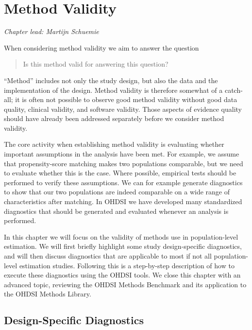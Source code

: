 \documentclass[11pt]{book}
\theoremstyle{definition}
\theoremstyle{definition}
\theoremstyle{definition}
\theoremstyle{remark}
\begin{document}
\chapter{Method Validity}\label{MethodValidity}


\emph{Chapter lead: Martijn Schuemie}

When considering method validity we aim to answer the question

\begin{quote}
Is this method valid for answering this question?
\end{quote}

``Method'' includes not only the study design, but also the data and the
implementation of the design. Method validity is therefore somewhat of a
catch-all; it is often not possible to observe good method validity
without good data quality, clinical validity, and software validity.
Those aspects of evidence quality should have already been addressed
separately before we consider method validity.

The core activity when establishing method validity is evaluating
whether important assumptions in the analysis have been met. For
example, we assume that propensity-score matching makes two populations
comparable, but we need to evaluate whether this is the case. Where
possible, empirical tests should be performed to verify these
assumptions. We can for example generate diagnostics to show that our
two populations are indeed comparable on a wide range of characteristics
after matching. In OHDSI we have developed many standardized diagnostics
that should be generated and evaluated whenever an analysis is
performed.

In this chapter we will focus on the validity of methods use in
population-level estimation. We will first briefly highlight some study
design-specific diagnostics, and will then discuss diagnostics that are
applicable to most if not all population-level estimation studies.
Following this is a step-by-step description of how to execute these
diagnostics using the OHDSI tools. We close this chapter with an
advanced topic, reviewing the OHDSI Methods Benchmark and its
application to the OHDSI Methods Library.

\section{Design-Specific Diagnostics}\label{design-specific-diagnostics}
\end{document}
